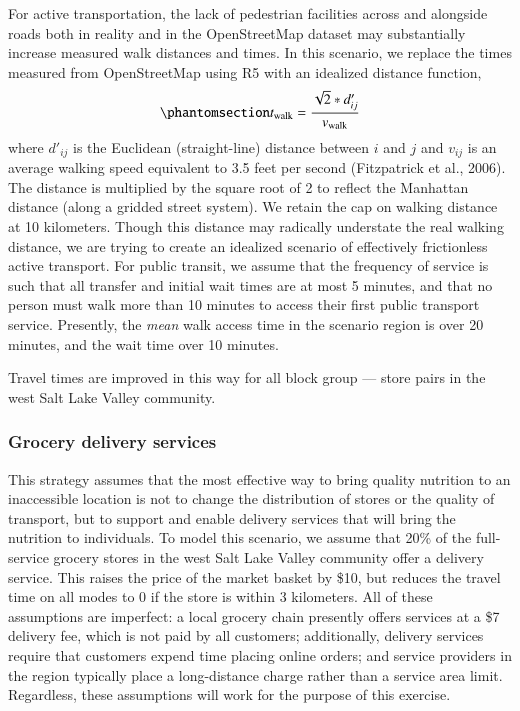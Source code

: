 \documentclass[
  letterpaper,
  number,
  review,
  doubleblind,
  3p]{elsarticle}
\begin{document}
For active transportation, the lack of pedestrian facilities across and
alongside roads both in reality and in the OpenStreetMap dataset may
substantially increase measured walk distances and times. In this
scenario, we replace the times measured from OpenStreetMap using R5 with
an idealized distance function,
\begin{equation}\phantomsection\label{eq-newwalk}{
t_{\mathrm{walk}} = \frac{\sqrt{2} * d'_{ij}}{v_{\mathrm{walk}}}
}\end{equation} where \(d'_{ij}\) is the Euclidean (straight-line)
distance between \(i\) and \(j\) and \(v_{ij}\) is an average walking
speed equivalent to 3.5 feet per second (Fitzpatrick et al., 2006). The
distance is multiplied by the square root of 2 to reflect the Manhattan
distance (along a gridded street system). We retain the cap on walking
distance at 10 kilometers. Though this distance may radically understate
the real walking distance, we are trying to create an idealized scenario
of effectively frictionless active transport. For public transit, we
assume that the frequency of service is such that all transfer and
initial wait times are at most 5 minutes, and that no person must walk
more than 10 minutes to access their first public transport service.
Presently, the \emph{mean} walk access time in the scenario region is
over 20 minutes, and the wait time over 10 minutes.

Travel times are improved in this way for all block group --- store
pairs in the west Salt Lake Valley community.

\subsubsection{Grocery delivery
services}\label{grocery-delivery-services}

This strategy assumes that the most effective way to bring quality
nutrition to an inaccessible location is not to change the distribution
of stores or the quality of transport, but to support and enable
delivery services that will bring the nutrition to individuals. To model
this scenario, we assume that 20\% of the full-service grocery stores in
the west Salt Lake Valley community offer a delivery service. This
raises the price of the market basket by \$10, but reduces the travel
time on all modes to 0 if the store is within 3 kilometers. All of these
assumptions are imperfect: a local grocery chain presently offers
services at a \$7 delivery fee, which is not paid by all customers;
additionally, delivery services require that customers expend time
placing online orders; and service providers in the region typically
place a long-distance charge rather than a service area limit.
Regardless, these assumptions will work for the purpose of this
exercise.
\end{document}
